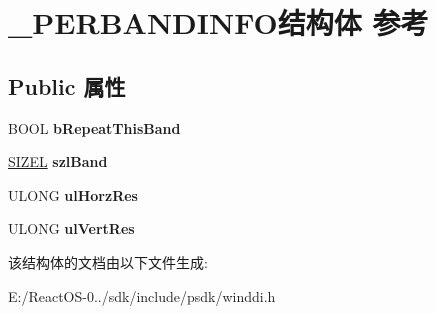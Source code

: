 \hypertarget{struct___p_e_r_b_a_n_d_i_n_f_o}{}\section{\+\_\+\+P\+E\+R\+B\+A\+N\+D\+I\+N\+F\+O结构体 参考}
\label{struct___p_e_r_b_a_n_d_i_n_f_o}
\subsection*{Public 属性}
\begin{DoxyCompactItemize}
\item 
\mbox{\label{struct___p_e_r_b_a_n_d_i_n_f_o_a5f49eef11fe9eef0b540bde2032a3abb}} 
B\+O\+OL {\bfseries b\+Repeat\+This\+Band}
\item 
\mbox{\label{struct___p_e_r_b_a_n_d_i_n_f_o_a7642841f89b01a6250d2fca7a479361d}} 
\hyperlink{structtag_s_i_z_e}{S\+I\+Z\+EL} {\bfseries szl\+Band}
\item 
\mbox{\label{struct___p_e_r_b_a_n_d_i_n_f_o_aa03eda85f7f40a0f637f665151c8947b}} 
U\+L\+O\+NG {\bfseries ul\+Horz\+Res}
\item 
\mbox{\label{struct___p_e_r_b_a_n_d_i_n_f_o_a9928715e53a36f33801726e2f4be0923}} 
U\+L\+O\+NG {\bfseries ul\+Vert\+Res}
\end{DoxyCompactItemize}


该结构体的文档由以下文件生成\+:\begin{DoxyCompactItemize}
\item 
E\+:/\+React\+O\+S-\/0../sdk/include/psdk/winddi.\+h\end{DoxyCompactItemize}
